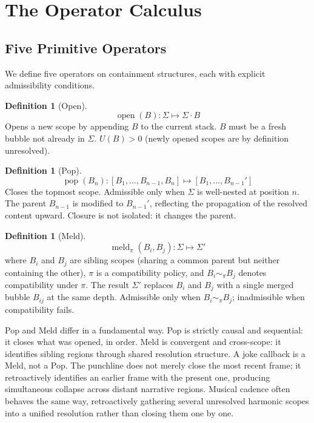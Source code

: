 \documentclass[12pt, a4paper]{article}
\theoremstyle{plain}
\theoremstyle{definition}
\newtheorem{definition}[theorem]{Definition}
\theoremstyle{remark}
\DeclareMathOperator{\Open}{open}
\DeclareMathOperator{\Pop}{pop}
\DeclareMathOperator{\Meld}{meld}
\begin{document}
\section{The Operator Calculus}
\label{sec:operators}

\subsection{Five Primitive Operators}

We define five operators on containment structures, each with explicit
admissibility conditions.

\begin{definition}[Open]
\[
  \Open(B) : \Sigma \mapsto \Sigma \cdot B
\]
Opens a new scope by appending $B$ to the current stack. $B$ must be a fresh
bubble not already in $\Sigma$. $U(B) > 0$ (newly opened scopes are by
definition unresolved).
\end{definition}

\begin{definition}[Pop]
\[
  \Pop(B_n) : [B_1, \ldots, B_{n-1}, B_n] \mapsto [B_1, \ldots, B_{n-1}']
\]
Closes the topmost scope. Admissible only when $\Sigma$ is well-nested at
position $n$. The parent $B_{n-1}$ is modified to $B_{n-1}'$, reflecting the
propagation of the resolved content upward. Closure is not isolated: it
changes the parent.
\end{definition}

\begin{definition}[Meld]
\[
  \Meld_\pi(B_i, B_j) : \Sigma \mapsto \Sigma'
\]
where $B_i$ and $B_j$ are sibling scopes (sharing a common parent but neither
containing the other), $\pi$ is a compatibility policy, and $B_i \sim_\pi
B_j$ denotes compatibility under $\pi$. The result $\Sigma'$ replaces $B_i$
and $B_j$ with a single merged bubble $B_{ij}$ at the same depth. Admissible
only when $B_i \sim_\pi B_j$; inadmissible when compatibility fails.
\end{definition}

Pop and Meld differ in a fundamental way. Pop is strictly causal and
sequential: it closes what was opened, in order. Meld is convergent and
cross-scope: it identifies sibling regions through shared resolution
structure. A joke callback is a Meld, not a Pop. The punchline does not
merely close the most recent frame; it retroactively identifies an earlier
frame with the present one, producing simultaneous collapse across distant
narrative regions. Musical cadence often behaves the same way, retroactively
gathering several unresolved harmonic scopes into a unified resolution rather
than closing them one by one.
\end{document}
